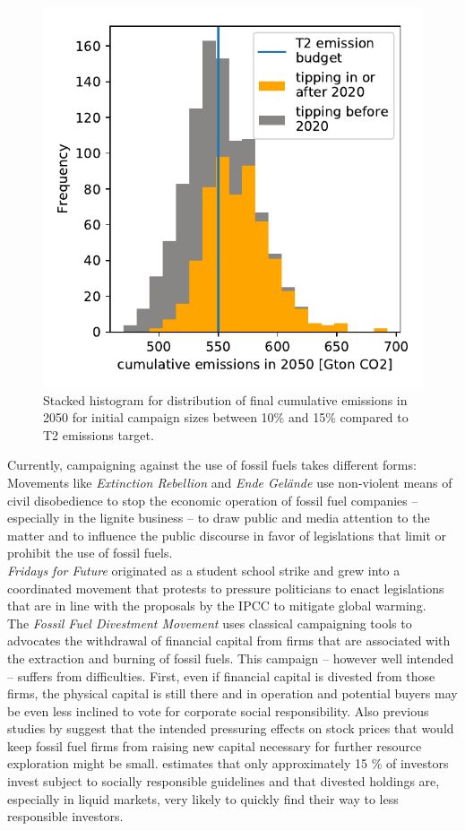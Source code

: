\begin{figure}
	\vspace{-.4 cm}
        \hspace{-1.4 cm}
        \includegraphics[width = .57 \textwidth]{./figures/emissions_with_campaign.pdf}
        \caption{Stacked histogram for distribution of final cumulative emissions in 2050 for initial campaign sizes between 10\% and 15\% compared to T2 emissions target. \label{fig:campaign_sucess}}
\end{figure}
Currently, campaigning against the use of fossil fuels takes different forms: \\

Movements like \textit{Extinction Rebellion} and \textit{Ende Gel\"{a}nde} use non-violent means of civil disobedience to stop the economic operation of fossil fuel companies -- especially in the lignite business -- to draw public and media attention to the matter and to influence the public discourse in favor of legislations that limit or prohibit the use of fossil fuels.\\

\textit{Fridays for Future} originated as a student school strike and grew into a coordinated movement that protests to pressure politicians to enact legislations that are in line with the proposals by the IPCC to mitigate global warming.\\

The \textit{Fossil Fuel Divestment Movement} uses classical campaigning tools to advocates the withdrawal of financial capital from firms that are associated with the extraction and burning of fossil fuels. This campaign -- however well intended -- suffers from difficulties. First, even if financial capital is divested from those firms, the physical capital is still there and in operation and potential buyers may be even less inclined to vote for corporate social responsibility. Also previous studies by \cite{Ans2013} suggest that the intended pressuring effects on stock prices that would keep fossil fuel firms from raising new capital necessary for further resource exploration might be small. \cite{SIF2014Report} estimates that only approximately 15 \% of investors invest subject to socially responsible guidelines and that divested holdings are, especially in liquid markets, very likely to quickly find their way to less responsible investors.\\

